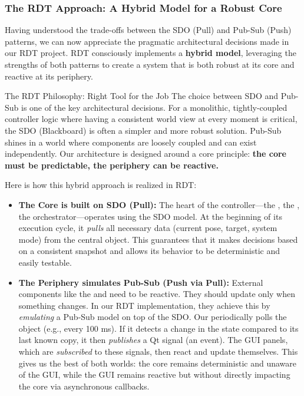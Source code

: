 
\subsubsection{The RDT Approach: A Hybrid Model for a Robust Core}
\label{subsubsec:rdt_hybrid_model}

Having understood the trade-offs between the SDO (Pull) and Pub-Sub (Push) patterns, we can now appreciate the pragmatic architectural decisions made in our RDT project. RDT consciously implements a \textbf{hybrid model}, leveraging the strengths of both patterns to create a system that is both robust at its core and reactive at its periphery.

\begin{principlebox}{The RDT Philosophy: Right Tool for the Job}
The choice between SDO and Pub-Sub is one of the key architectural decisions. For a monolithic, tightly-coupled controller logic where having a consistent world view at every moment is critical, the SDO (Blackboard) is often a simpler and more robust solution. Pub-Sub shines in a world where components are loosely coupled and can exist independently. Our architecture is designed around a core principle: \textbf{the core must be predictable, the periphery can be reactive.}
\end{principlebox}

Here is how this hybrid approach is realized in RDT:

\begin{itemize}
    \item \textbf{The Core is built on SDO (Pull):} The heart of the controller—the , the , the  orchestrator—operates using the SDO model. At the beginning of its execution cycle, it \textit{pulls} all necessary data (current pose, target, system mode) from the central  object. This guarantees that it makes decisions based on a consistent snapshot and allows its behavior to be deterministic and easily testable.
    
    \item \textbf{The Periphery simulates Pub-Sub (Push via Pull):} External components like the  and  need to be reactive. They should update only when something changes. In our RDT implementation, they achieve this by \textit{emulating} a Pub-Sub model on top of the SDO. Our  periodically polls the  object (e.g., every 100 ms). If it detects a change in the state compared to its last known copy, it then \textit{publishes} a Qt signal (an event). The GUI panels, which are \textit{subscribed} to these signals, then react and update themselves. This gives us the best of both worlds: the core remains deterministic and unaware of the GUI, while the GUI remains reactive but without directly impacting the core via asynchronous callbacks.
\end{itemize}

